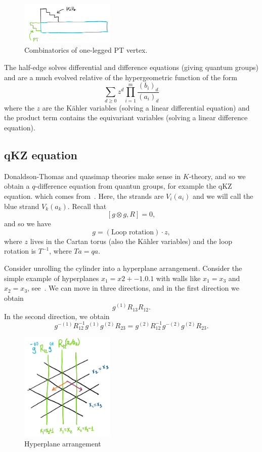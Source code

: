 \documentclass[leqno, openany]{memoir}
\theoremstyle{definition}
\theoremstyle{remark}
\theoremstyle{plain}
\theoremstyle{definition}
\theoremstyle{remark}
\begin{document}
\begin{figure}[h]
    \centering
    \includegraphics[width=0.4\textwidth]{ptcomb}
    \caption{Combinatorics of one-legged PT vertex.}
    \label{fig:ptcomb}
\end{figure}

The half-edge solves differential and difference equations (giving quantum groups) and are a much evolved relative of the hypergeometric function of the form
\[ \sum_{d \geq 0} z^d \prod_{i=1}^m \frac{(b_i)_d}{(a_i)_d} \]
where the $z$ are the K\"ahler variables (solving a linear differential equation) and the product term contains the equivariant variables (solving a linear difference equation).

\subsection{qKZ equation}

Donaldson-Thomas and quasimap theories make sense in $K$-theory, and so we obtain a $q$-difference equation from quantun groups, for example the qKZ equation. which comes from~. Here, the strands are $V_i(a_i)$ and we will call the blue strand $V_k(a_k)$. Recall that
\[ [g \otimes g, R] = 0, \]
and so we have 
\[ g = (\text{Loop rotation}) \cdot z, \]
where $z$ lives in the Cartan torus (also the K\"ahler variables) and the loop rotation is $T^{-1}$, where $Ta = qa$. 

Consider unrolling the cylinder into a hyperplane arrangement. Consider the simple example of hyperplanes $x_1=x2+\qty{-1,0,1}$ with walls like $x_1=x_3$ and $x_2=x_3$, see~. We can move in three directions, and in the first direction we obtain
\[ g^{(1)} R_{13} R_{12}. \]
In the second direction, we obtain
\[ g^{-(1)} R_{12}^{-1} g^{(1)} g^{(2)} R_{23} = g^{(2)} R_{12}^{-1} g^{-(2)} g^{(2)} R_{23}. \]

\begin{figure}[h]
    \centering
    \includegraphics[width=0.4\textwidth]{hyperplane}
    \caption{Hyperplane arrangement}
    \label{fig:hyperplane}
\end{figure}
\end{document}
